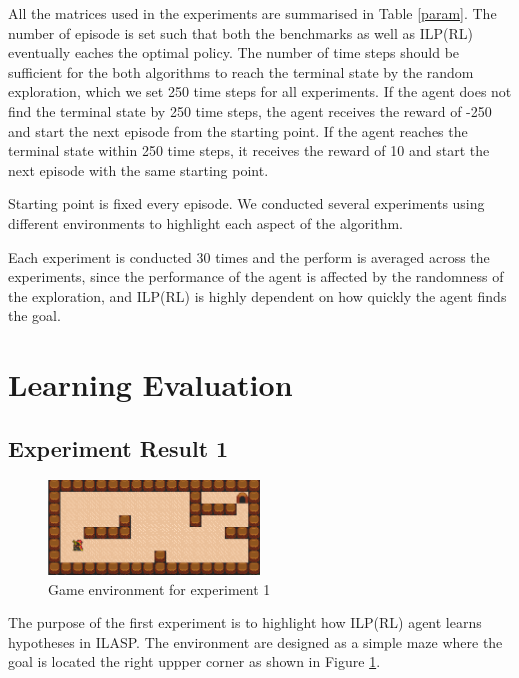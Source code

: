 All the matrices used in the experiments are summarised in Table \ref{param}.
The number of episode is set such that both the benchmarks as well as ILP(RL) eventually eaches the optimal policy. 
The number of time steps should be sufficient for the both algorithms to reach the terminal state by the random exploration, 
which we set 250 time steps for all experiments. If the agent does not find the terminal state by 250 time steps, the agent receives the reward of -250 and 
start the next episode from the starting point. If the agent reaches the terminal state within 250 time steps, it receives the reward of 10 and start the next episode with the same starting point. 


Starting point is fixed every episode. 
We conducted several experiments using different environments to highlight each aspect of the algorithm.

Each experiment is conducted 30 times and the perform is averaged across the experiments, 
since the performance of the agent is affected by the randomness of the exploration,
and ILP(RL) is highly dependent on how quickly the agent finds the goal.

\section{Learning Evaluation}
\label{sec:learning_evaluation}

\subsection{Experiment Result 1}
\label{subsec:experiment_result_1}

\begin{figure}[!htb]
\centering
\includegraphics[width=0.5\textwidth]{./figures/experiment1}
\caption{Game environment for experiment 1}
\label{experiment1}
\end{figure}

The purpose of the first experiment is to highlight how ILP(RL) agent learns hypotheses in ILASP.
The environment are designed as a simple maze where the goal is located the right uppper corner as shown in Figure \ref{experiment1}.

